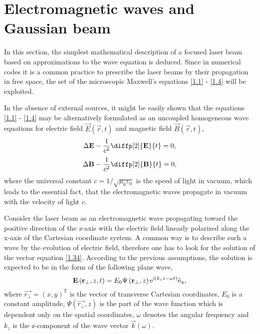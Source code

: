\section{Electromagnetic waves and Gaussian beam}
In this section, the simplest mathematical description of a focused laser beam based on approximations to the wave equation is deduced. Since in numerical codes it is a common practice to prescribe the laser beams by their propagation in free space, the set of the microscopic Maxwell's equations \ref{1.1} - \ref{1.4} will be exploited.

In the absence of external sources, it might be easily shown that the equations \ref{1.1} - \ref{1.4} may be alternatively formulated as an uncoupled homogeneous wave equations for electric field $ \vec{E}\left( \vec{r}, t \right) $ and magnetic field $ \vec{B}\left( \vec{r}, t \right) $,
\begin{equation}
\label{1.34}
\laplace{\vec{E}} - \frac{1}{c^{2}} \diffp[2]{\vec{E}}{t} = 0,
\end{equation}
\begin{equation}
\label{1.35}
\laplace{\vec{B}} - \frac{1}{c^{2}} \diffp[2]{\vec{B}}{t} = 0,
\end{equation}
where the universal constant $ c = 1/\sqrt{\mu_0 \varepsilon_0} $ is the speed of light in vacuum, which leads to the essential fact, that the electromagnetic waves propagate in vacuum with the velocity of light $ c $.

Consider the laser beam as an electromagnetic wave propagating toward the positive direction of the z-axis with the electric field linearly polarized along the x-axis of the Cartesian coordinate system. A common way is to describe such a wave by the evolution of electric field, therefore one has to look for the solution of the vector equation \ref{1.34}. According to the previous assumptions, the solution is expected to be in the form of the following plane wave,
\begin{equation}
\label{1.36}
\mathbf{E}\left(\mathbf{r_\bot}, z, t \right)  = E_0 \Psi \left(\mathbf{r_\bot}, z \right) \mathrm{e}^{\mathrm{i} \left(k_z z - \omega t \right)} \mathrm{\hat{e}_x},
\end{equation}
where $ \vec{r_\bot} = (x, y)^{\mathrm{T}} $ is the vector of transverse Cartesian coordinates, $ E_0 $ is a constant amplitude, $ \Psi \left(\vec{r_\bot}, z \right) $ is the part of the wave function which is dependent only on the spatial coordinates, $ \omega $ denotes the angular frequency and $ k_z $ is the z-component of the wave vector $ \vec{k}\left(\omega \right) $.

